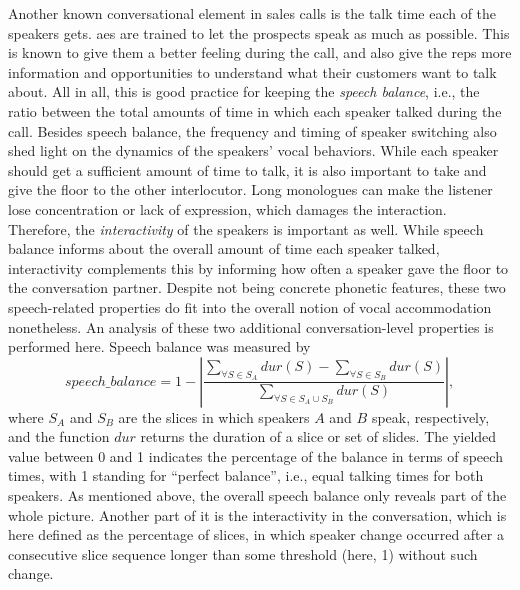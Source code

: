 %
Another known conversational element in sales calls is the talk time each of the speakers gets.
\Acp{ae} are trained to let the prospects speak as much as possible.
This is known to give them a better feeling during the call, and also give the reps more information and opportunities to understand what their customers want to talk about.
All in all, this is good practice for keeping the \emph{speech balance}, i.e., the ratio between the total amounts of time in which each speaker talked during the call.
Besides speech balance, the frequency and timing of speaker switching also shed light on the dynamics of the speakers' vocal behaviors.
While each speaker should get a sufficient amount of time to talk, it is also important to take and give the floor to the other interlocutor.
Long monologues can make the listener lose concentration or lack of expression, which damages the interaction.
Therefore, the \emph{interactivity} of the speakers is important as well.
While speech balance informs about the overall amount of time each speaker talked, interactivity complements this by informing how often a speaker gave the floor to the conversation partner.
Despite not being concrete phonetic features, these two speech-related properties do fit into the overall notion of vocal accommodation nonetheless.
An analysis of these two additional conversation-level properties is performed here.
Speech balance was measured by
%
\begin{equation}
	\label{eq:speech_balance}
	speech\_balance = 
	1 - \left| \frac{\displaystyle \sum_{\forall S \in S_A} dur(S) - 
						\sum_{\forall S \in S_B} dur(S)}
					{\displaystyle \sum_{\forall S \in S_A \cup S_B} dur(S)}
		\right|,
\end{equation}
\noindent
%
where $S_A$ and $S_B$ are the slices in which speakers $A$ and $B$ speak, respectively, and the function $dur$ returns the duration of a slice or set of slides.
The yielded value between 0 and 1 indicates the percentage of the balance in terms of speech times, with 1 standing for \enquote{perfect balance}, i.e., equal talking times for both speakers.
As mentioned above, the overall speech balance only reveals part of the whole picture.
Another part of it is the interactivity in the conversation, which is here defined as
%
%
the percentage of slices, in which speaker change occurred after a consecutive slice sequence longer than some threshold (here, 1) without such change.
